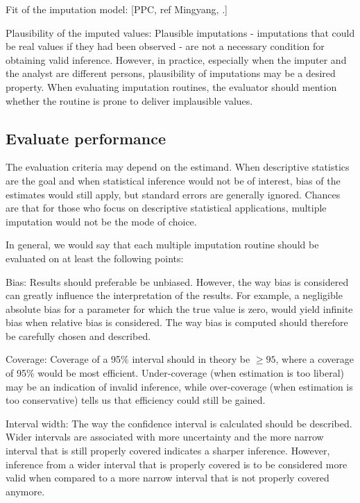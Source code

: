 \documentclass[bimj,fleqn]{w-art}
\theoremstyle{plain}
\theoremstyle{definition}
\begin{document}
Fit of the imputation model: [PPC, ref Mingyang, \citep{nguy17, zhao22}.]

Plausibility of the imputed values: Plausible imputations - imputations that could be real values if they had been observed - are not a necessary condition for obtaining valid inference. However, in practice, especially when the imputer and the analyst are different persons, plausibility of imputations may be a desired property. When evaluating imputation routines, the evaluator should mention whether the routine is prone to deliver implausible values. 



\subsection{Evaluate performance}


The evaluation criteria may depend on the estimand. When descriptive statistics are the goal and when statistical inference would not be of interest, bias of the estimates would still apply, but standard errors are generally ignored. Chances are that for those who focus on descriptive statistical applications, multiple imputation would not be the mode of choice. 

In general, we would say that each multiple imputation routine should be evaluated on at least the following points:

Bias: Results should preferable be unbiased. However, the way bias is considered can greatly influence the interpretation of the results. For example, a negligible absolute bias for a parameter for which the true value is zero, would yield infinite bias when relative bias is considered. The way bias is computed should therefore be carefully chosen and described. 

Coverage: Coverage of a 95\% interval should in theory be $\geq 95$, where a coverage of 95\% would be most efficient. Under-coverage (when estimation is too liberal) may be an indication of invalid inference, while over-coverage (when estimation is too conservative) tells us that efficiency could still be gained. 

Interval width: The way the confidence interval is calculated should be described. Wider intervals are associated with more uncertainty and the more narrow interval that is still properly covered indicates a sharper inference. However, inference from a wider interval that is properly covered is to be considered more valid when compared to a more narrow interval that is not properly covered anymore. 
\end{document}
